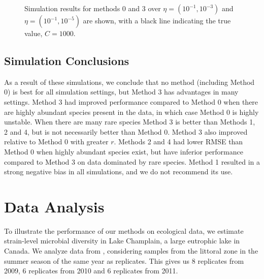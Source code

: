 \documentclass[12pt]{article}
\theoremstyle{break}
\theoremstyle{break}
\begin{document}
\begin{figure}[t]
\caption{Simulation results for methods 0 and 3 over $\eta = (10^{-1}, 10^{-3})$ and $\eta = (10^{-1}, 10^{-5})$ are shown, with a black line indicating the true value, $C = 1000$.
\label{fig:tuning_sim_2}}
\centering{}
\end{figure}

\subsection{Simulation Conclusions}

As a result of these simulations, we conclude that no method (including Method 0) is best for all simulation settings, but Method 3 has advantages in many settings. Method 3 had improved performance compared to Method 0 when there are highly abundant species present in the data, in which case Method 0 is highly unstable.  When there are many rare species Method 3 is better than Methods 1, 2 and 4, but is not necessarily better than Method 0.  Method 3 also improved relative to Method 0 with greater $r$.  Methods 2 and 4 had lower RMSE than Method 0 when highly abundant species exist, but have inferior performance compared to Method 3 on data dominated by rare species. Method 1 resulted in a strong negative bias in all simulations, and we do not recommend its use.

\section{Data Analysis}
\label{sec:data_analysis}

To illustrate the performance of our methods on ecological data, we estimate strain-level microbial diversity in Lake Champlain, a large eutrophic lake in Canada.  We analyze data from \citet{tromas_2017}, considering samples from the littoral zone in the summer season of the same year as replicates. This gives us 8 replicates from 2009, 6 replicates from 2010 and 6 replicates from 2011.  %
\end{document}
